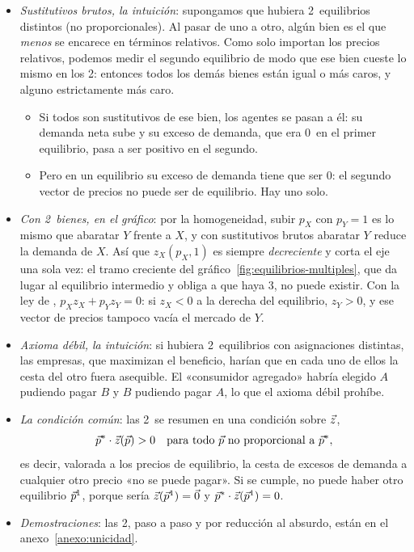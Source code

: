 \documentclass[11pt]{article}
\begin{document}
\begin{itemize}
\item \emph{Sustitutivos brutos, la intuición}: supongamos que hubiera 2~equilibrios distintos (no proporcionales). Al pasar de uno a otro, algún bien es el que \emph{menos} se encarece en términos relativos. Como solo importan los precios relativos, podemos medir el segundo equilibrio de modo que ese bien cueste lo mismo en los 2: entonces todos los demás bienes están igual o más caros, y alguno estrictamente más caro.
  \begin{itemize}
  \item Si todos son sustitutivos de ese bien, los agentes se pasan a él: su demanda neta sube y su exceso de demanda, que era 0~en el primer equilibrio, pasa a ser positivo en el segundo.
  \item Pero en un equilibrio su exceso de demanda tiene que ser 0: el segundo vector de precios no puede ser de equilibrio. Hay uno solo.
  \end{itemize}
\item \emph{Con 2~bienes, en el gráfico}: por la homogeneidad, subir $p_X$ con $p_Y=1$ es lo mismo que abaratar $Y$ frente a $X$, y con sustitutivos brutos abaratar $Y$ reduce la demanda de $X$. Así que $z_X(p_X,1)$ es siempre \emph{decreciente} y corta el eje una sola vez: el tramo creciente del gráfico~\ref{fig:equilibrios-multiples}, que da lugar al equilibrio intermedio y obliga a que haya 3, no puede existir. Con la ley de , $p_Xz_X+p_Yz_Y=0$: si $z_X<0$ a la derecha del equilibrio, $z_Y>0$, y ese vector de precios tampoco vacía el mercado de $Y$.
\item \emph{Axioma débil, la intuición}: si hubiera 2~equilibrios con asignaciones distintas, las empresas, que maximizan el beneficio, harían que en cada uno de ellos la cesta del otro fuera asequible. El «consumidor agregado» habría elegido $A$ pudiendo pagar $B$ y $B$ pudiendo pagar $A$, lo que el axioma débil prohíbe.
\item \emph{La condición común}: las 2~se resumen en una condición sobre $\vec{z}$\nocite{MasColellWhinstonGreen1995},
  \begin{equation}
  \vec{p}^*\cdot\vec{z}(\vec{p})>0\quad\text{para todo }\vec{p}\text{ no proporcional a }\vec{p}^*, \label{eq:condicion-unicidad}
  \end{equation}
  es decir, valorada a los precios de equilibrio, la cesta de excesos de demanda a cualquier otro precio «no se puede pagar». Si se cumple, no puede haber otro equilibrio $\vec{p}^1$, porque sería $\vec{z}(\vec{p}^1)=\vec{0}$ y $\vec{p}^*\cdot\vec{z}(\vec{p}^1)=0$.
\item \emph{Demostraciones}: las 2, paso a paso y por reducción al absurdo, están en el anexo~\ref{anexo:unicidad}.
\end{itemize}
\end{document}
